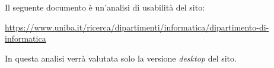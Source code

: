 Il seguente documento è un'analisi di usabilità del sito: \\
	\begin{center}
		\url{https://www.uniba.it/ricerca/dipartimenti/informatica/dipartimento-di-informatica}
	\end{center} 
In questa analisi verrà valutata solo la versione \textit{desktop} del sito.
 